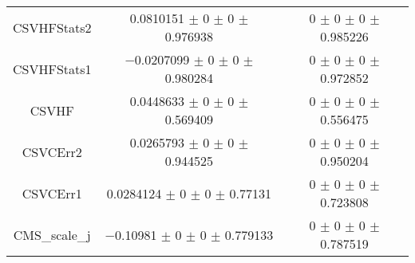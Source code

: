 \begin{table}
\begin{tabular}{ccc}
CSVHFStats2 	& \num{0.0810151} $\pm$ \num{0} $\pm$ \num{0} $\pm$ \num{0.976938} 	& \num{0} $\pm$ \num{0} $\pm$ \num{0} $\pm$ \num{0.985226}\\
CSVHFStats1 	& \num{-0.0207099} $\pm$ \num{0} $\pm$ \num{0} $\pm$ \num{0.980284} 	& \num{0} $\pm$ \num{0} $\pm$ \num{0} $\pm$ \num{0.972852}\\
CSVHF 	& \num{0.0448633} $\pm$ \num{0} $\pm$ \num{0} $\pm$ \num{0.569409} 	& \num{0} $\pm$ \num{0} $\pm$ \num{0} $\pm$ \num{0.556475}\\
CSVCErr2 	& \num{0.0265793} $\pm$ \num{0} $\pm$ \num{0} $\pm$ \num{0.944525} 	& \num{0} $\pm$ \num{0} $\pm$ \num{0} $\pm$ \num{0.950204}\\
CSVCErr1 	& \num{0.0284124} $\pm$ \num{0} $\pm$ \num{0} $\pm$ \num{0.77131} 	& \num{0} $\pm$ \num{0} $\pm$ \num{0} $\pm$ \num{0.723808}\\
CMS\_scale\_j 	& \num{-0.10981} $\pm$ \num{0} $\pm$ \num{0} $\pm$ \num{0.779133} 	& \num{0} $\pm$ \num{0} $\pm$ \num{0} $\pm$ \num{0.787519}\\
\bottomrule
\end{tabular}
\end{table}